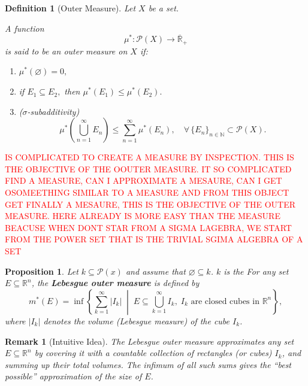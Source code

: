 \documentclass[10pt, oneside]{article}
\newenvironment{definitionbox}[1][]{\begin{defbox}\begin{defn}[#1]}{\end{defn}\end{defbox}}
\newenvironment{remarkbox}[1][]{\begin{rembox}\begin{rem}[#1]}{\end{rem}\end{rembox}}
\numberwithin{equation}{section}
\newtheorem{defn}{Definition}[section]
\newtheorem{rem}{Remark}
\newtheorem{proposition}{Proposition}[section]
\begin{document}
\begin{definitionbox}[Outer Measure]
Let \( X \) be a set.

A function 
\[
\mu^* : \mathcal{P}(X) \longrightarrow \overline{\mathbb{R}}_{+}
\]
is said to be an \emph{outer measure} on \( X \) if:
\begin{enumerate}[label=(\roman*)]
    \item \(\mu^*(\varnothing) = 0,\)
    \item if \(E_1 \subseteq E_2,\) then \(\mu^*(E_1) \leq \mu^*(E_2).\)
    \item (\(\sigma\)-subadditivity)
    \[
    \mu^*\!\left(\bigcup_{n=1}^{\infty} E_n\right)
    \leq 
    \sum_{n=1}^{\infty} \mu^*(E_n),
    \quad \forall\, \{E_n\}_{n\in\mathbb{N}} \subset \mathcal{P}(X).
    \]

\end{enumerate}
\end{definitionbox}

\textcolor{red}{IS COMPLICATED TO CREATE A MEASURE BY INSPECTION. THIS IS THE OBJECTIVE OF THE OOUTER MEASURE.
IT SO COMPLICATED FIND A MEASURE, CAN I APPROXIMATE A MESAURE, CAN I GET OSOMEETHING SIMILAR TO A MEASURE AND FROM THIS OBJECT GET FINALLY A MESAURE, THIS IS THE OBJECTIVE OF THE OUTER MEASURE.}
\textcolor{red}{HERE ALREADY IS MORE EASY THAN THE MEASURE BEACUSE WHEN DONT STAR FROM A SIGMA LAGEBRA, WE START FROM THE POWER SET THAT IS THE TRIVIAL SGIMA ALGEBRA OF A SET}

\begin{proposition}
Let $k \subseteq \mathcal{P}(x)$ and assume that $\varnothing \subseteq k$. $k$  is the 
For any set \(E \subseteq \mathbb{R}^n\), the \textbf{Lebesgue outer measure} is defined by
\[
m^*(E) = \inf\!\left\{ 
    \sum_{k=1}^{\infty} |I_k| 
    \; \middle| \; 
    E \subseteq \bigcup_{k=1}^{\infty} I_k, 
    \; I_k \text{ are closed cubes in } \mathbb{R}^n
\right\},
\]
where \(|I_k|\) denotes the volume (Lebesgue measure) of the cube \(I_k\).
\end{proposition}

\begin{remarkbox}[Intuitive Idea]
The Lebesgue outer measure approximates any set \(E \subseteq \mathbb{R}^n\)
by covering it with a countable collection of rectangles (or cubes) \(I_k\),
and summing up their total volumes. 
The infimum of all such sums gives the “best possible” approximation of the size of \(E\).
\end{remarkbox}

\begin{center}
\end{center}
\end{document}
